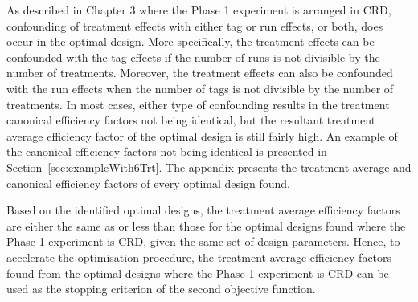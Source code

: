 As described in Chapter 3 where the Phase 1 experiment is arranged in CRD, confounding of treatment effects with either tag or run effects, or both, does occur in the optimal design. More specifically, the treatment effects can be confounded with the tag effects if the number of runs is not divisible by the number of treatments. Moreover, the treatment effects can also be confounded with the run effects when the number of tags is not divisible by the number of treatments. In most cases, either type of confounding results in the treatment canonical efficiency factors not being identical, but the resultant treatment average efficiency factor of the optimal design is still fairly high. An example of the canonical efficiency factors not being identical is presented in Section~\ref{sec:exampleWith6Trt}. The appendix presents the treatment average and canonical efficiency factors of every optimal design found. 
  
Based on the identified optimal designs, the treatment average efficiency factors are either the same as or less than those for the optimal designs found where the Phase 1 experiment is CRD, given the same set of design parameters. Hence, to accelerate the optimisation procedure, the treatment average efficiency factors found from the optimal designs where the Phase 1 experiment is CRD can be used as the stopping criterion of the second objective function.




